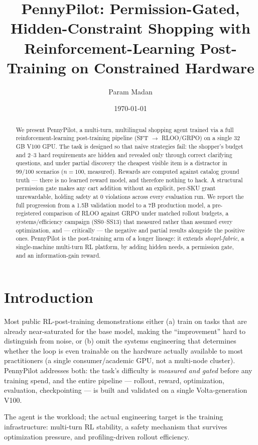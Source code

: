 \documentclass[11pt]{article}
\title{PennyPilot: Permission-Gated, Hidden-Constraint Shopping with\\
Reinforcement-Learning Post-Training on Constrained Hardware}
\author{Param Madan}
\date{\today}
\begin{document}
\maketitle

\begin{abstract}
We present PennyPilot, a multi-turn, multilingual shopping agent trained via a
full reinforcement-learning post-training pipeline (SFT $\rightarrow$ RLOO/GRPO)
on a single 32\,GB V100 GPU. The task is designed so that naive strategies fail:
the shopper's budget and 2--3 hard requirements are hidden and revealed only
through correct clarifying questions, and under partial discovery the cheapest
visible item is a distractor in 99/100 scenarios ($n{=}100$, measured). Rewards
are computed against catalog ground truth --- there is no learned reward model,
and therefore nothing to hack. A structural permission gate makes any cart
addition without an explicit, per-SKU grant unrewardable, holding safety at 0
violations across every evaluation run. We report the full progression from a
1.5B validation model to a 7B production model, a pre-registered comparison of
RLOO against GRPO under matched rollout budgets, a systems/efficiency campaign
(SS0--SS13) that measured rather than assumed every optimization, and ---
critically --- the negative and partial results alongside the positive ones.
PennyPilot is the post-training arm of a longer lineage: it extends
\emph{shoprl-fabric}, a single-machine multi-turn RL platform, by adding hidden
needs, a permission gate, and an information-gain reward.
\end{abstract}

\section{Introduction}
Most public RL-post-training demonstrations either (a) train on tasks that are
already near-saturated for the base model, making the ``improvement'' hard to
distinguish from noise, or (b) omit the systems engineering that determines
whether the loop is even trainable on the hardware actually available to most
practitioners (a single consumer/academic GPU, not a multi-node cluster).
PennyPilot addresses both: the task's difficulty is \emph{measured and gated}
before any training spend, and the entire pipeline --- rollout, reward,
optimization, evaluation, checkpointing --- is built and validated on a single
Volta-generation V100.

The agent is the workload; the actual engineering target is the training
infrastructure: multi-turn RL stability, a safety mechanism that survives
optimization pressure, and profiling-driven rollout efficiency.
\end{document}
